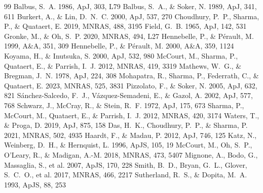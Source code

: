 \documentclass[11pt]{article}
\begin{document}
\begin{thebibliography}{99}
Balbus, S.~A. 1986, ApJ, 303, L79
Balbus, S.~A., \& Soker, N. 1989, ApJ, 341, 611
Burkert, A., \& Lin, D.~N.~C. 2000, ApJ, 537, 270
Choudhury, P.~P., Sharma, P., \& Quataert, E. 2019, MNRAS, 488, 3195
Field, G.~B. 1965, ApJ, 142, 531
Gronke, M., \& Oh, S.~P. 2020, MNRAS, 494, L27
Hennebelle, P., \& P\'erault, M. 1999, A\&A, 351, 309
Hennebelle, P., \& P\'erault, M. 2000, A\&A, 359, 1124
Koyama, H., \& Inutsuka, S. 2000, ApJ, 532, 980
McCourt, M., Sharma, P., Quataert, E., \& Parrish, I.~J. 2012, MNRAS, 419, 3319
Mathews, W.~G., \& Bregman, J.~N. 1978, ApJ, 224, 308
Mohapatra, R., Sharma, P., Federrath, C., \& Quataert, E. 2023, MNRAS, 525, 3831
Pizzolato, F., \& Soker, N. 2005, ApJ, 632, 821
S\'anchez-Salcedo, F.~J., V\'azquez-Semadeni, E., \& Gazol, A. 2002, ApJ, 577, 768
Schwarz, J., McCray, R., \& Stein, R.~F. 1972, ApJ, 175, 673
Sharma, P., McCourt, M., Quataert, E., \& Parrish, I.~J. 2012, MNRAS, 420, 3174
Waters, T., \& Proga, D. 2019, ApJ, 875, 158
Das, H.~K., Choudhury, P.~P., \& Sharma, P. 2021, MNRAS, 502, 4935
Haardt, F., \& Madau, P. 2012, ApJ, 746, 125
Katz, N., Weinberg, D.~H., \& Hernquist, L. 1996, ApJS, 105, 19
McCourt, M., Oh, S.~P., O'Leary, R., \& Madigan, A.-M. 2018, MNRAS, 473, 5407
Mignone, A., Bodo, G., Massaglia, S., et al. 2007, ApJS, 170, 228
Smith, B.~D., Bryan, G.~L., Glover, S.~C.~O., et al. 2017, MNRAS, 466, 2217
Sutherland, R.~S., \& Dopita, M.~A. 1993, ApJS, 88, 253
\end{thebibliography}
\end{document}
